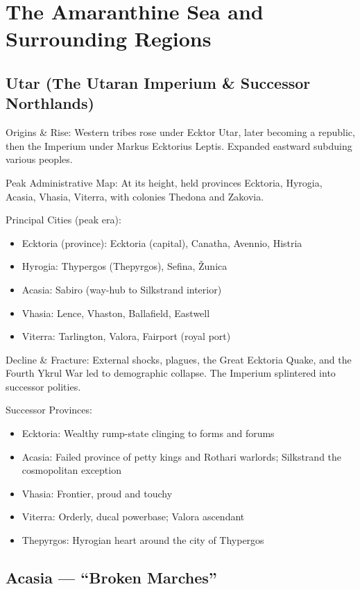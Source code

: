 \section{The Amaranthine Sea and Surrounding Regions}

\subsection{Utar (The Utaran Imperium \& Successor Northlands)}
\label{sec:utar}

Origins \& Rise: Western tribes rose under Ecktor Utar, later becoming a republic, then the Imperium under Markus Ecktorius Leptis. Expanded eastward subduing various peoples.

Peak Administrative Map: At its height, held provinces Ecktoria, Hyrogia, Acasia, Vhasia, Viterra, with colonies Thedona and Zakovia.

Principal Cities (peak era):
\begin{itemize}
    \item Ecktoria (province): Ecktoria (capital), Canatha, Avennio, Histria
    \item Hyrogia: Thypergos (Thepyrgos), Sefina, Žunica
    \item Acasia: Sabiro (way-hub to Silkstrand interior)
    \item Vhasia: Lence, Vhaston, Ballafield, Eastwell
    \item Viterra: Tarlington, Valora, Fairport (royal port)
\end{itemize}

Decline \& Fracture: External shocks, plagues, the Great Ecktoria Quake, and the Fourth Ykrul War led to demographic collapse. The Imperium splintered into successor polities.

Successor Provinces:
\begin{itemize}
    \item Ecktoria: Wealthy rump-state clinging to forms and forums
    \item Acasia: Failed province of petty kings and Rothari warlords; Silkstrand the cosmopolitan exception
    \item Vhasia: Frontier, proud and touchy
    \item Viterra: Orderly, ducal powerbase; Valora ascendant
    \item Thepyrgos: Hyrogian heart around the city of Thypergos
\end{itemize}

\subsection{Acasia --- ``Broken Marches''}
\label{sec:acasia}

